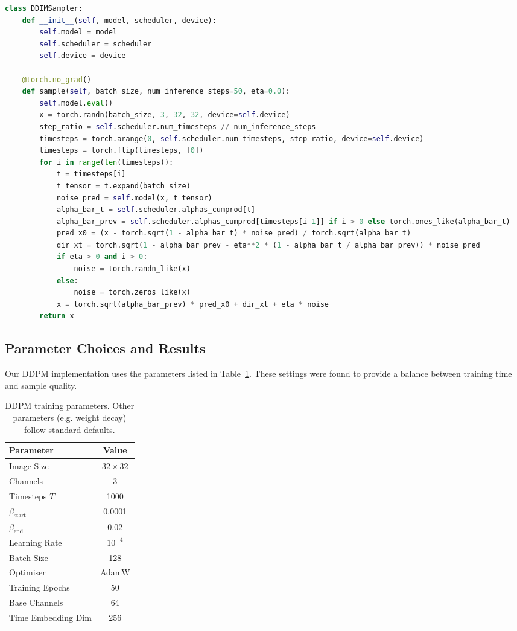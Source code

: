 \begin{lstlisting}[language=Python, caption=DDIM Sampler]
class DDIMSampler:
    def __init__(self, model, scheduler, device):
        self.model = model
        self.scheduler = scheduler
        self.device = device

    @torch.no_grad()
    def sample(self, batch_size, num_inference_steps=50, eta=0.0):
        self.model.eval()
        x = torch.randn(batch_size, 3, 32, 32, device=self.device)
        step_ratio = self.scheduler.num_timesteps // num_inference_steps
        timesteps = torch.arange(0, self.scheduler.num_timesteps, step_ratio, device=self.device)
        timesteps = torch.flip(timesteps, [0])
        for i in range(len(timesteps)):
            t = timesteps[i]
            t_tensor = t.expand(batch_size)
            noise_pred = self.model(x, t_tensor)
            alpha_bar_t = self.scheduler.alphas_cumprod[t]
            alpha_bar_prev = self.scheduler.alphas_cumprod[timesteps[i-1]] if i > 0 else torch.ones_like(alpha_bar_t)
            pred_x0 = (x - torch.sqrt(1 - alpha_bar_t) * noise_pred) / torch.sqrt(alpha_bar_t)
            dir_xt = torch.sqrt(1 - alpha_bar_prev - eta**2 * (1 - alpha_bar_t / alpha_bar_prev)) * noise_pred
            if eta > 0 and i > 0:
                noise = torch.randn_like(x)
            else:
                noise = torch.zeros_like(x)
            x = torch.sqrt(alpha_bar_prev) * pred_x0 + dir_xt + eta * noise
        return x
\end{lstlisting}

\subsection{Parameter Choices and Results}

Our DDPM implementation uses the parameters listed in
Table~\ref{tab:ddpmparams}.  These settings were found to provide a
balance between training time and sample quality.

\begin{table}[H]
  \centering
  \begin{tabular}{lc}
    \toprule
    \textbf{Parameter} & \textbf{Value} \\
    \midrule
    Image Size & $32\times 32$ \\
    Channels & 3 \\
    Timesteps $T$ & 1000 \\
    $\beta_{\text{start}}$ & 0.0001 \\
    $\beta_{\text{end}}$ & 0.02 \\
    Learning Rate & $10^{-4}$ \\
    Batch Size & 128 \\
    Optimiser & AdamW \\
    Training Epochs & 50 \\
    Base Channels & 64 \\
    Time Embedding Dim & 256 \\
    \bottomrule
  \end{tabular}
  \caption{DDPM training parameters.  Other parameters (e.g. weight
    decay) follow standard defaults.}
  \label{tab:ddpmparams}
\end{table}

